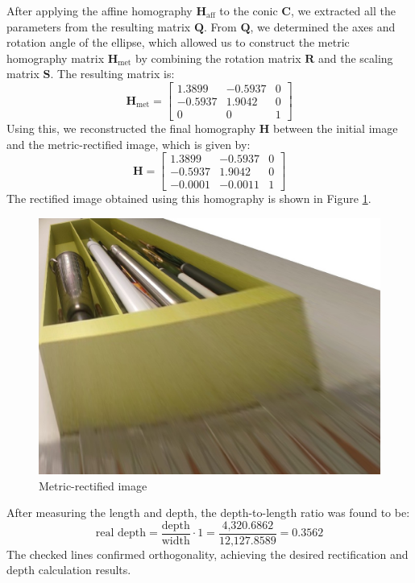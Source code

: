 \documentclass{Academic}
\begin{document}
After applying the affine homography $\mathbf{H}_{\text{aff}}$ to the conic $\mathbf{C}$, we extracted all the parameters from the resulting matrix $\mathbf{Q}$. 
From $\mathbf{Q}$, we determined the axes and rotation angle of the ellipse, which allowed us to construct the metric homography matrix $\mathbf{H}_{\text{met}}$ by combining the rotation matrix $\mathbf{R}$ and the scaling matrix $\mathbf{S}$.
The resulting matrix is:
\begin{equation}\mathbf{H}_{\text{met}}=\begin{bmatrix}
    1.3899 & -0.5937 & 0 \\
    -0.5937 & 1.9042 & 0 \\
    0 & 0 & 1
\end{bmatrix}\end{equation}
Using this, we reconstructed the final homography $\mathbf{H}$ between the initial image and the metric-rectified image, which is given by:
\begin{equation}\mathbf{H}=\begin{bmatrix}
    1.3899 & -0.5937 & 0 \\
   -0.5937 & 1.9042 & 0 \\
   -0.0001 & -0.0011 & 1
\end{bmatrix}\end{equation}
\noindent The rectified image obtained using this homography is shown in Figure \ref{fig:metric}.
\begin{figure}[!htb]%
    \centering
    \includegraphics[width=0.5\linewidth]{images/metric.jpg}
    \caption{Metric-rectified image}
    \label{fig:metric}
\end{figure}

After measuring the length and depth, the depth-to-length ratio was found to be:
\begin{equation}\text{real depth}=\dfrac{\text{depth}}{\text{width}} \cdot 1 = \dfrac{\text{4,320.6862}}{\text{12,127.8589}} = 0.3562\end{equation}
The checked lines confirmed orthogonality, achieving the desired rectification and depth calculation results.
\end{document}
